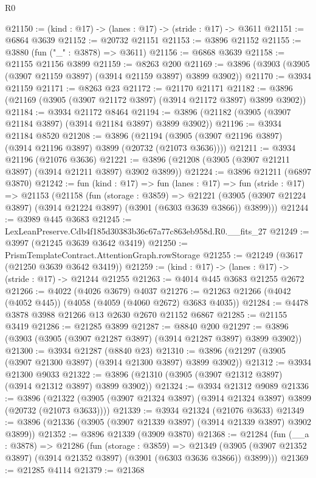 \begin{lexlean}{R0}
\begin{coremodule}
@21150 := (kind : @17) -> (lanes : @17) -> (stride : @17) -> @3611
@21151 := @6864 @3639
@21152 := @20732 @21151
@21153 := @3896 @21152
@21155 := @3880 (fun ("_" : @3878) => @3611)
@21156 := @6868 @3639
@21158 := @21155 @21156 @3899
@21159 := @8263 @200
@21169 := @3896 (@3903 (@3905 (@3907 @21159 @3897) (@3914 @21159 @3897) @3899 @3902))
@21170 := @3934 @21159
@21171 := @8263 @23
@21172 := @21170 @21171
@21182 := @3896 (@21169 (@3905 (@3907 @21172 @3897) (@3914 @21172 @3897) @3899 @3902))
@21184 := @3934 @21172 @8464
@21194 := @3896 (@21182 (@3905 (@3907 @21184 @3897) (@3914 @21184 @3897) @3899 @3902))
@21196 := @3934 @21184 @8520
@21208 := @3896
    (@21194 (@3905 (@3907 @21196 @3897) (@3914 @21196 @3897) @3899 (@20732 (@21073 @3636))))
@21211 := @3934 @21196 (@21076 @3636)
@21221 := @3896 (@21208 (@3905 (@3907 @21211 @3897) (@3914 @21211 @3897) @3902 @3899))
@21224 := @3896 @21211 (@6897 @3870)
@21242 := fun (kind : @17) =>
  fun (lanes : @17) =>
  fun (stride : @17) =>
  @21153
    (@21158
      (fun (storage : @3859) =>
      @21221 (@3905 (@3907 @21224 @3897) (@3914 @21224 @3897) (@3901 (@6303 @3639 @3866)) @3899)))
@21244 := @3989 @445 @3683
@21245 := LexLeanPreserve.Cdb4f185d30383b36c67a77c863eb958d.R0.__fits_27
@21249 := @3997 (@21245 @3639 @3642 @3419)
@21250 := PrismTemplateContract.AttentionGraph.rowStorage
@21255 := @21249 (@3617 (@21250 @3639 @3642 @3419))
@21259 := (kind : @17) -> (lanes : @17) -> (stride : @17) -> @21244 @21255
@21263 := @4014 @445 @3683 @21255 @2672
@21266 := @4022 (@4026 @3679) @4037
@21276 := @21263 @21266 (@4042 (@4052 @445)) (@4058 (@4059 (@4060 @2672) @3683 @4035))
@21284 := @4478 @3878 @3988 @21266 @13 @2630 @2670 @21152 @6867
@21285 := @21155 @3419
@21286 := @21285 @3899
@21287 := @8840 @200
@21297 := @3896 (@3903 (@3905 (@3907 @21287 @3897) (@3914 @21287 @3897) @3899 @3902))
@21300 := @3934 @21287 (@8840 @23)
@21310 := @3896 (@21297 (@3905 (@3907 @21300 @3897) (@3914 @21300 @3897) @3899 @3902))
@21312 := @3934 @21300 @9033
@21322 := @3896 (@21310 (@3905 (@3907 @21312 @3897) (@3914 @21312 @3897) @3899 @3902))
@21324 := @3934 @21312 @9089
@21336 := @3896
    (@21322 (@3905 (@3907 @21324 @3897) (@3914 @21324 @3897) @3899 (@20732 (@21073 @3633))))
@21339 := @3934 @21324 (@21076 @3633)
@21349 := @3896 (@21336 (@3905 (@3907 @21339 @3897) (@3914 @21339 @3897) @3902 @3899))
@21352 := @3896 @21339 (@3909 @3870)
@21368 := @21284
    (fun (__a : @3878) =>
    @21286
      (fun (storage : @3859) =>
      @21349 (@3905 (@3907 @21352 @3897) (@3914 @21352 @3897) (@3901 (@6303 @3636 @3866)) @3899)))
@21369 := @21285 @4114
@21379 := @21368

\end{coremodule}
\end{lexlean}
